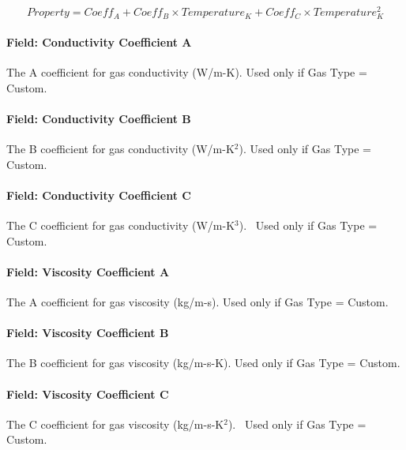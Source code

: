\begin{equation}
Property = Coef{f_A} + Coef{f_B} \times Temperatur{e_K} + Coef{f_C} \times Temperature_K^2
\end{equation}

\paragraph{Field: Conductivity Coefficient A}\label{field-conductivity-coefficient-a-1}

The A coefficient for gas conductivity (W/m-K). Used only if Gas Type = Custom.

\paragraph{Field: Conductivity Coefficient B}\label{field-conductivity-coefficient-b-1}

The B coefficient for gas conductivity (W/m-K\(^{2}\)). Used only if Gas Type = Custom.

\paragraph{Field: Conductivity Coefficient C}\label{field-conductivity-coefficient-c-1}

The C coefficient for gas conductivity (W/m-K\(^{3}\)).~ Used only if Gas Type = Custom.

\paragraph{Field: Viscosity Coefficient A}\label{field-viscosity-coefficient-a-1}

The A coefficient for gas viscosity (kg/m-s). Used only if Gas Type = Custom.

\paragraph{Field: Viscosity Coefficient B}\label{field-viscosity-coefficient-b-1}

The B coefficient for gas viscosity (kg/m-s-K). Used only if Gas Type = Custom.

\paragraph{Field: Viscosity Coefficient C}\label{field-viscosity-coefficient-c-1}

The C coefficient for gas viscosity (kg/m-s-K\(^{2}\)).~ Used only if Gas Type = Custom.

